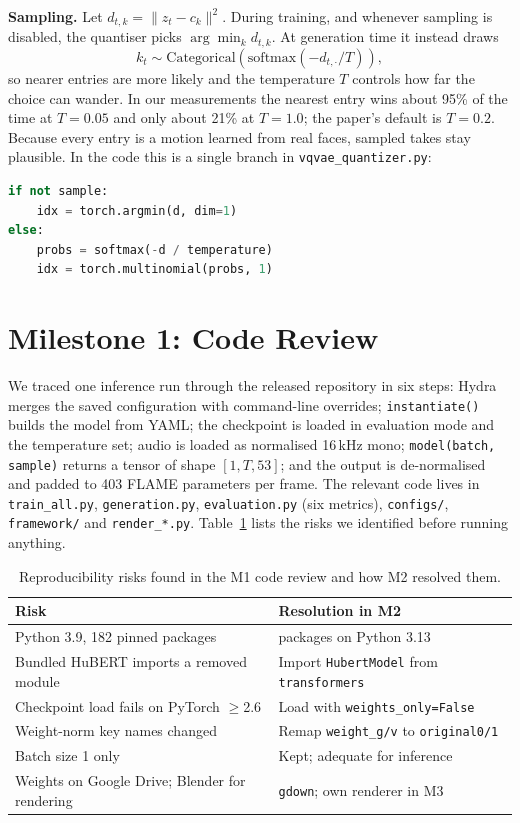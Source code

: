 \documentclass[10pt,twocolumn,letterpaper]{article}
\begin{document}
\textbf{Sampling.} Let $d_{t,k}=\lVert z_t-c_k\rVert^2$. During training, and whenever sampling is disabled, the quantiser picks $\arg\min_k d_{t,k}$. At generation time it instead draws
\begin{equation}
k_t \sim \mathrm{Categorical}\!\left(\mathrm{softmax}\!\left(-d_{t,\cdot}/T\right)\right),
\label{eq:sample}
\end{equation}
so nearer entries are more likely and the temperature $T$ controls how far the choice can wander. In our measurements the nearest entry wins about 95\% of the time at $T{=}0.05$ and only about 21\% at $T{=}1.0$; the paper's default is $T{=}0.2$. Because every entry is a motion learned from real faces, sampled takes stay plausible. In the code this is a single branch in \texttt{vqvae\_quantizer.py}:
\begin{lstlisting}[language=Python]
if not sample:
    idx = torch.argmin(d, dim=1)
else:
    probs = softmax(-d / temperature)
    idx = torch.multinomial(probs, 1)
\end{lstlisting}

\section{Milestone 1: Code Review}
\label{sec:m1}
We traced one inference run through the released repository in six steps: Hydra merges the saved configuration with command-line overrides; \texttt{instantiate()} builds the model from YAML; the checkpoint is loaded in evaluation mode and the temperature set; audio is loaded as normalised 16\,kHz mono; \texttt{model(batch, sample)} returns a tensor of shape $[1,T,53]$; and the output is de-normalised and padded to 403 FLAME parameters per frame. The relevant code lives in \texttt{train\_all.py}, \texttt{generation.py}, \texttt{evaluation.py} (six metrics), \texttt{configs/}, \texttt{framework/} and \texttt{render\_*.py}. Table~\ref{tab:risks} lists the risks we identified before running anything.

\begin{table}[t]
\centering\small
\caption{Reproducibility risks found in the M1 code review and how M2 resolved them.}
\label{tab:risks}
\begin{tabular}{@{}>{\raggedright\arraybackslash}p{3.5cm}>{\raggedright\arraybackslash}p{3.8cm}@{}}
\toprule
Risk & Resolution in M2\\
\midrule
Python 3.9, 182 pinned packages & 38 packages on Python 3.13\\
Bundled HuBERT imports a removed module & Import \texttt{HubertModel} from \texttt{transformers}\\
Checkpoint load fails on PyTorch $\geq$2.6 & Load with \texttt{weights\_only=False}\\
Weight-norm key names changed & Remap \texttt{weight\_g/v} to \texttt{original0/1}\\
Batch size 1 only & Kept; adequate for inference\\
Weights on Google Drive; Blender for rendering & \texttt{gdown}; own renderer in M3\\
\bottomrule
\end{tabular}
\end{table}
\end{document}
